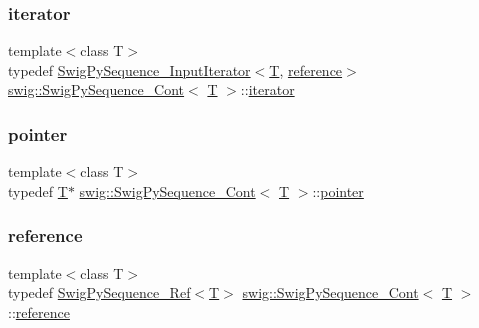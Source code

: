 \subsubsection{\texorpdfstring{iterator}{iterator}}
{\footnotesize\ttfamily template$<$class T$>$ \\
typedef \hyperlink{structswig_1_1_swig_py_sequence___input_iterator}{Swig\+Py\+Sequence\+\_\+\+Input\+Iterator}$<$\hyperlink{fmt_8h_a0acb682b8260ab1c60b918599864e2e5}{T}, \hyperlink{structswig_1_1_swig_py_sequence___cont_a4108668900abc99b72844a3a880b3638}{reference}$>$ \hyperlink{structswig_1_1_swig_py_sequence___cont}{swig\+::\+Swig\+Py\+Sequence\+\_\+\+Cont}$<$ \hyperlink{fmt_8h_a0acb682b8260ab1c60b918599864e2e5}{T} $>$\+::\hyperlink{structswig_1_1_swig_py_sequence___cont_abcd331d0657a109f34c0fd84c5be87dd}{iterator}}

\mbox{\label{structswig_1_1_swig_py_sequence___cont_a168a126e49131e25b2616d411f71fb9a}} 
\subsubsection{\texorpdfstring{pointer}{pointer}}
{\footnotesize\ttfamily template$<$class T$>$ \\
typedef \hyperlink{fmt_8h_a0acb682b8260ab1c60b918599864e2e5}{T}$\ast$ \hyperlink{structswig_1_1_swig_py_sequence___cont}{swig\+::\+Swig\+Py\+Sequence\+\_\+\+Cont}$<$ \hyperlink{fmt_8h_a0acb682b8260ab1c60b918599864e2e5}{T} $>$\+::\hyperlink{structswig_1_1_swig_py_sequence___cont_a168a126e49131e25b2616d411f71fb9a}{pointer}}

\mbox{\label{structswig_1_1_swig_py_sequence___cont_a4108668900abc99b72844a3a880b3638}} 
\subsubsection{\texorpdfstring{reference}{reference}}
{\footnotesize\ttfamily template$<$class T$>$ \\
typedef \hyperlink{structswig_1_1_swig_py_sequence___ref}{Swig\+Py\+Sequence\+\_\+\+Ref}$<$\hyperlink{fmt_8h_a0acb682b8260ab1c60b918599864e2e5}{T}$>$ \hyperlink{structswig_1_1_swig_py_sequence___cont}{swig\+::\+Swig\+Py\+Sequence\+\_\+\+Cont}$<$ \hyperlink{fmt_8h_a0acb682b8260ab1c60b918599864e2e5}{T} $>$\+::\hyperlink{structswig_1_1_swig_py_sequence___cont_a4108668900abc99b72844a3a880b3638}{reference}}

